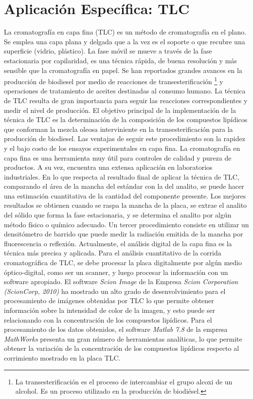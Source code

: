 \section{Aplicaci\'on Espec\'ifica: TLC}
La cromatograf\'ia en capa fina (TLC) es un m\'etodo de cromatograf\'ia en el plano. Se emplea una capa plana y delgada que a la vez es el soporte o que recubre una superficie (vidrio, pl\'astico). La fase m\'ovil se mueve a trav\'es de la fase estacionaria por capilaridad, es una t\'ecnica r\'apida, de buena resoluci\'on y m\'as sensible que la cromatograf\'ia en papel. 
Se han reportados grandes avances en la producci\'on de biodiesel por medio de reacciones de transesterificaci\'on \footnote{La transesterificaci\'on es el proceso de intercambiar el grupo alcoxi de un alcohol. Es un proceso utilizado en la producci\'on de biodi\'esel.} y operaciones de tratamiento de aceites destinadas al consumo humano. La t\'ecnica de TLC resulta de gran importancia para seguir las reacciones correspondientes y medir el nivel de producci\'on.
El objetivo principal de la implementaci\'on de la t\'ecnica de TLC es la determinaci\'on de la composici\'on de los compuestos lip\'idicos que conforman la mezcla oleosa interviniente en la transesterificaci\'on para la producci\'on de biodiesel.
Las ventajas de seguir este procedimiento son la rapidez y el bajo costo de los ensayos experimentales en capa fina. La cromatograf\'ia en capa fina es una herramienta muy \'util para controles de calidad y pureza de productos. A su vez, encuentra una extensa aplicaci\'on en laboratorios industriales.
En lo que respecta al resultado final de aplicar la t\'ecnica de TLC, comparando el \'area de la mancha del est\'andar con la del analito, se puede hacer una estimaci\'on cuantitativa de la cantidad del componente presente. Los mejores resultados se obtienen cuando se raspa la mancha de la placa, se extrae el analito del s\'olido que forma la fase estacionaria, y se determina el analito por alg\'un m\'etodo f\'isico o qu\'imico adecuado. Un tercer procedimiento consiste en utilizar un densit\'ometro de barrido que puede medir la radiaci\'on emitida de la mancha por fluorescencia o reflexi\'on. Actualmente, el an\'alisis digital de la capa fina es la t\'ecnica m\'as precisa y aplicada.
Para el an\'alisis cuantitativo de la corrida cromatográfica de TLC, se debe procesar la placa digitalmente por alg\'un medio \'optico-digital, como ser un scanner, y luego procesar la informaci\'on con un software apropiado. El software \textit{Scion Image} de la Empresa \textit{Scion Corporation (ScionCorp, 2010)} ha mostrado un alto grado de desenvolvimiento para el procesamiento de im\'agenes obtenidas por TLC lo que permite obtener informaci\'on sobre la intensidad de color de la imagen, y esto puede ser relacionando con la concentraci\'on de los compuestos lip\'idicos. Para el procesamiento de los datos obtenidos, el software \textit{Matlab 7.8} de la empresa \textit{MathWorks} presenta un gran n\'umero de herramientas anal\'iticas, lo que permite obtener la variaci\'on de la concentraci\'on de los compuestos lip\'idicos respecto al corrimiento mostrado en la placa TLC.

